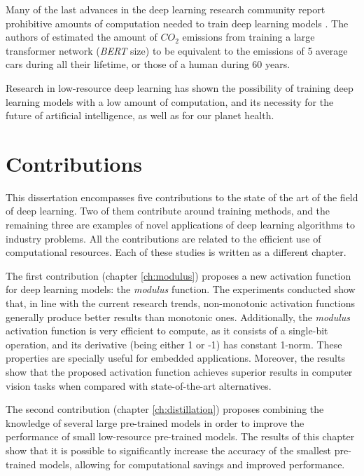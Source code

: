 Many of the last advances in the deep learning research community report prohibitive amounts of computation needed to train deep learning models \autocite{silver2016, kechyn2018, brown2020, floridi2020}. The authors of \autocite{strubell2019} estimated the amount of $CO_2$ emissions from training a large transformer network (\textit{BERT} size) to be equivalent to the emissions of 5 average cars during all their lifetime, or those of a human during 60 years. 

Research in low-resource deep learning \autocite{howard2017, Han2017, Gao2018, sanchez2020, so2021} has shown the possibility of training deep learning models with a low amount of computation, and its necessity for the future of artificial intelligence, as well as for our planet health.


\section{Contributions}
This dissertation encompasses five contributions to the state of the art of the field of deep learning. Two of them contribute around training methods, and the remaining three are examples of novel applications of deep learning algorithms to industry problems. All the contributions are related to the efficient use of computational resources. Each of these studies is written as a different chapter.

The first contribution (chapter \ref{ch:modulus}) proposes a new activation function for deep learning models: the \textit{modulus} function. The experiments conducted show that, in line with the current research trends, non-monotonic activation functions generally produce better results than monotonic ones. Additionally, the \textit{modulus} activation function is very efficient to compute, as it consists of a single-bit operation, and its derivative (being either 1 or -1) has constant 1-norm. These properties are specially useful for embedded applications. Moreover, the results show that the proposed activation function achieves superior results in computer vision tasks when compared with state-of-the-art alternatives.

The second contribution (chapter \ref{ch:distillation}) proposes combining the knowledge of several large pre-trained models in order to improve the performance of small low-resource pre-trained models. The results of this chapter show that it is possible to significantly increase the accuracy of the smallest pre-trained models, allowing for computational savings and improved performance.

